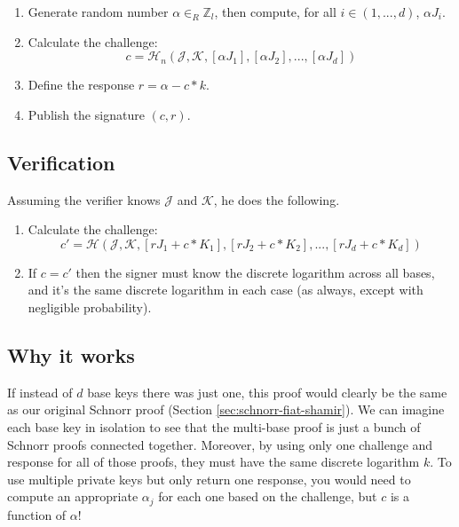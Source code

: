 \begin{enumerate}
	\item Generate random number $\alpha \in_R \mathbb{Z}_l$, then compute, for all $i \in (1,...,d)$, $\alpha J_i$.
	\item Calculate the challenge:\vspace{.155cm}
	\[c = \mathcal{H}_n(\mathcal{J},\mathcal{K},[\alpha J_1],[\alpha J_2],...,[\alpha J_d])\]
	\item Define the response $r = \alpha - c*k$.
	\item Publish the signature $(c, r)$.
\end{enumerate}


\subsection*{Verification}

Assuming the verifier knows $\mathcal{J}$ and $\mathcal{K}$, he does the following.

\begin{enumerate}
	\item Calculate the challenge:\vspace{.175cm}
	\[c' = \mathcal{H}(\mathcal{J},\mathcal{K},[r J_1 + c*K_1],[r J_2 + c*K_2],...,[r J_d + c*K_d])\]
	\item If $c = c'$ then the signer must know the discrete logarithm across all bases, and it's the same discrete logarithm in each case (as always, except with negligible probability).
\end{enumerate}


\subsection*{Why it works}

If instead of $d$ base keys there was just one, this proof would clearly be the same as our original Schnorr proof (Section \ref{sec:schnorr-fiat-shamir}). We can imagine each base key in isolation to see that the multi-base proof is just a bunch of Schnorr proofs connected together. Moreover, by using only one challenge and response for all of those proofs, they must have the same discrete logarithm $k$. To use multiple private keys but only return one response, you would need to compute an appropriate $\alpha_j$ for each one based on the challenge, but $c$ is a function of $\alpha$!



